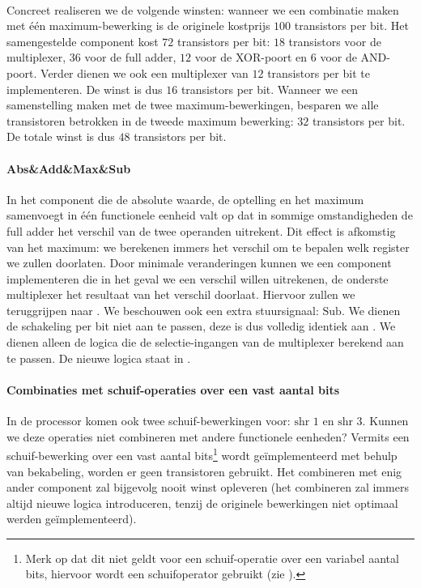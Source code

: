 \paragraph{}
Concreet realiseren we de volgende winsten: wanneer we een combinatie maken met \'e\'en maximum-bewerking is de originele kostprijs $100$ transistors per bit. Het samengestelde component kost $72$ transistors per bit: $18$ transistors voor de multiplexer, $36$ voor de full adder, $12$ voor de XOR-poort en $6$ voor de AND-poort. Verder dienen we ook een multiplexer van $12$ transistors per bit te implementeren. De winst is dus $16$ transistors per bit. Wanneer we een samenstelling maken met de twee maximum-bewerkingen, besparen we alle transistoren betrokken in de tweede maximum bewerking: $32$ transistors per bit. De totale winst is dus $48$ transistors per bit.
\paragraph{Abs\&Add\&Max\&Sub}In het component die de absolute waarde, de optelling en het maximum samenvoegt in \'e\'en functionele eenheid valt op dat in sommige omstandigheden de full adder het verschil van de twee operanden uitrekent. Dit effect is afkomstig van het maximum: we berekenen immers het verschil om te bepalen welk register we zullen doorlaten. Door minimale veranderingen kunnen we een component implementeren die in het geval we een verschil willen uitrekenen, de onderste multiplexer het resultaat van het verschil doorlaat. Hiervoor zullen we teruggrijpen naar . We beschouwen ook een extra stuursignaal: $\mbox{Sub}$. We dienen de schakeling per bit niet aan te passen, deze is dus volledig identiek aan . We dienen alleen de logica die de selectie-ingangen van de multiplexer berekend aan te passen. De nieuwe logica staat in .
\paragraph{Combinaties met schuif-operaties over een vast aantal bits}In de processor komen ook twee schuif-bewerkingen voor: $\mbox{shr 1}$ en $\mbox{shr 3}$. Kunnen we deze operaties niet combineren met andere functionele eenheden? Vermits een schuif-bewerking over een vast aantal bits\footnote{Merk op dat dit niet geldt voor een schuif-operatie over een variabel aantal bits, hiervoor wordt een schuifoperator gebruikt (zie ).} wordt ge\"implementeerd met behulp van bekabeling, worden er geen transistoren gebruikt. Het combineren met enig ander component zal bijgevolg nooit winst opleveren (het combineren zal immers altijd nieuwe logica introduceren, tenzij de originele bewerkingen niet optimaal werden ge\"implementeerd).
